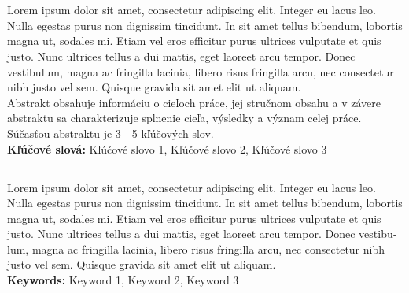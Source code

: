\makeatletter
\renewenvironment{abstract}{
    \if@twocolumn
        \section*{\abstractname}%
    \else
        \normalfont\small
        \begin{flushleft} %
            {\bfseries \abstractname\par}%
        \end{flushleft}%
        \noindent\raggedright
    \fi
}
{
    \if@twocolumn\else\par\fi
}
\makeatother

\begin{abstract}

    Lorem ipsum dolor sit amet, consectetur adipiscing elit. Integer eu lacus leo. Nulla egestas purus non dignissim tincidunt. In sit amet tellus bibendum, lobortis magna ut, sodales mi. Etiam vel eros efficitur purus ultrices vulputate et quis justo. Nunc ultrices tellus a dui mattis, eget laoreet arcu tempor. Donec vestibulum, magna ac fringilla lacinia, libero risus fringilla arcu, nec consectetur nibh justo vel sem. Quisque gravida sit amet elit ut aliquam.\\
    \hfill \break
    Abstrakt obsahuje informáciu o cieľoch práce, jej stručnom obsahu a v závere abstraktu sa charakterizuje splnenie cieľa, výsledky a význam celej práce. Súčasťou abstraktu je 3 - 5 kľúčových slov.
\vspace{1em}\\
\textbf{Kľúčové slová:} Kľúčové slovo 1, Kľúčové slovo 2, Kľúčové slovo 3

\end{abstract}
\pagebreak
\begin{otherlanguage}{english}
\begin{abstract}

    Lorem ipsum dolor sit amet, consectetur adipiscing elit. Integer eu lacus leo. Nulla egestas purus non dignissim tincidunt. In sit amet tellus bibendum, lobortis magna ut, sodales mi. Etiam vel eros efficitur purus ultrices vulputate et quis justo. Nunc ultrices tellus a dui mattis, eget laoreet arcu tempor. Donec vestibulum, magna ac fringilla lacinia, libero risus fringilla arcu, nec consectetur nibh justo vel sem. Quisque gravida sit amet elit ut aliquam. 
\vspace{1em}\\
\textbf{Keywords:} Keyword 1, Keyword 2, Keyword 3
\end{abstract}
\end{otherlanguage}